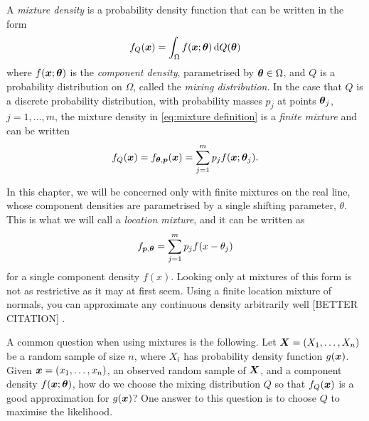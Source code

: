 
	A \emph{mixture density} is a probability density function that can be written in the form
	\begin{equation}
		f_Q({\bm{{x}}}) = \int_\Omega f({\bm{{x}}}; {\bm{{\theta}}}) \, \mathrm{d} Q({\bm{{\theta}}})
		\label{eq:mixture definition}
	\end{equation}
	where $f({\bm{{x}}};{\bm{{\theta}}})$ is the \emph{component density}, parametrised by ${\bm{{\theta}}} \in \Omega$, and $Q$ is a probability distribution on $\Omega$, called the \emph{mixing distribution}. In the case that $Q$ is a discrete probability distribution, with probability masses $p_j$ at points ${\bm{{\theta}}}_j$, $j = 1, \dots, m$, the mixture density in \eqref{eq:mixture definition} is a \emph{finite mixture} and can be written
	\begin{equation}
		f_Q({\bm{{x}}}) = f_{{\bm{{\theta}}}, {\bm{{p}}}}({\bm{{x}}}) = \sum_{j = 1}^m p_j f({\bm{{x}}}; {\bm{{\theta}}}_j).
	\end{equation}

	In this chapter, we will be concerned only with finite mixtures on the real line, whose component densities are parametrised by a single shifting parameter, $\theta$. This is what we will call a \emph{location mixture}, and it can be written as
	\begin{equation}
		f_{{\bm{{p}}}, {\bm{{\theta}}}} = \sum_{j = 1}^m p_j f(x - \theta_j)
		\label{eq:mixturesum}
	\end{equation}
	for a single component density $f(x)$.
	Looking only at mixtures of this form is not as restrictive as it may at first seem. Using a finite location mixture of normals, you can approximate any continuous density arbitrarily well [BETTER CITATION] \cite{McLachlan2004-ik}.

	A common question when using mixtures is the following. Let ${\bm{{X}}} = (X_1, \dots, X_n)$ be a random sample of size $n$, where $X_i$ has probability density function $g({\bm{{x}}})$. Given ${\bm{{x}}} = (x_1, \dots, x_n)$, an observed random sample of ${\bm{{X}}}$, and a component density $f({\bm{{x}}}; {\bm{{\theta}}})$, how do we choose the mixing distribution $Q$ so that $f_Q({\bm{{x}}})$ is a good approximation for $g({\bm{{x}}})$?	One answer to this question is to choose $Q$ to maximise the likelihood.

